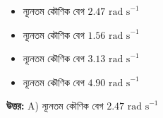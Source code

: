 \documentclass[12pt, a4paper]{article}
\begin{document}
\begin{itemize}[label={}, leftmargin=1cm, itemsep=0.5em]
\item[\textbf{A)}] ন্যূনতম কৌণিক বেগ $2.47\text{ rad s}^{-1}$
\item[\textbf{B)}] ন্যূনতম কৌণিক বেগ $1.56\text{ rad s}^{-1}$
\item[\textbf{C)}] ন্যূনতম কৌণিক বেগ $3.13\text{ rad s}^{-1}$
\item[\textbf{D)}] ন্যূনতম কৌণিক বেগ $4.90\text{ rad s}^{-1}$
\end{itemize}

\vspace{0.5em}
\begin{tcolorbox}[answerbox]
\textbf{\color{success} উত্তর:} A) ন্যূনতম কৌণিক বেগ $2.47\text{ rad s}^{-1}$
\end{tcolorbox}
\vspace{1em}
\end{document}
